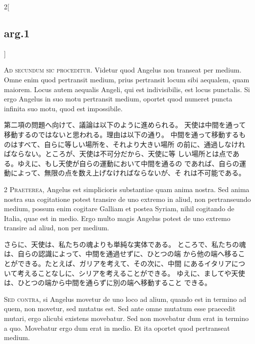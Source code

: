\documentclass[paper=a4paper,fontsize=10pt,jafontsize=9pt,titlepage]{jlreq}
\begin{document}
\begin{paracol}{2}[\subsection{arg.1}]

{\huge A}{\scshape d secundum sic proceditur}. Videtur quod
Angelus non transeat per medium. Omne enim quod pertransit medium, prius
pertransit locum sibi aequalem, quam maiorem. Locus autem aequalis
Angeli, qui est indivisibilis, est locus punctalis. Si ergo Angelus in
suo motu pertransit medium, oportet quod numeret puncta infinita suo
motu, quod est impossibile.

\switchcolumn

第二項の問題へ向けて、議論は以下のように進められる。
天使は中間を通って移動するのではないと思われる。理由は以下の通り。
中間を通って移動するものはすべて、自らに等しい場所を、それより大きい場所
 の前に、通過しなければならない。ところが、天使は不可分だから、天使に等
 しい場所とは点である。ゆえに、もし天使が自らの運動において中間を通るの
 であれば、自らの運動によって、無限の点を数え上げなければならないが、そ
 れは不可能である。


{\scshape 2 Praeterea}, Angelus est simplicioris
substantiae quam anima nostra. Sed anima nostra sua cogitatione potest
transire de uno extremo in aliud, non pertranseundo medium, possum enim
cogitare Galliam et postea Syriam, nihil cogitando de Italia, quae est
in medio. Ergo multo magis Angelus potest de uno extremo transire ad
aliud, non per medium.

\switchcolumn

さらに、天使は、私たちの魂よりも単純な実体である。
ところで、私たちの魂は、自らの認識によって、中間を通過せずに、ひとつの端
 から他の端へ移ることができる。たとえば、ガリアを考えて、その次に、中間
 にあるイタリアについて考えることなしに、シリアを考えることができる。
ゆえに、ましてや天使は、ひとつの端から中間を通らずに別の端へ移動すること
 できる。

\switchcolumn*[\subsection{s.c.}]

{\scshape Sed contra}, si Angelus movetur de uno loco
ad alium, quando est in termino ad quem, non movetur, sed mutatus
est. Sed ante omne mutatum esse praecedit mutari, ergo alicubi existens
movebatur. Sed non movebatur dum erat in termino a quo. Movebatur ergo
dum erat in medio. Et ita oportet quod pertranseat medium.


\end{paracol}
\end{document}
